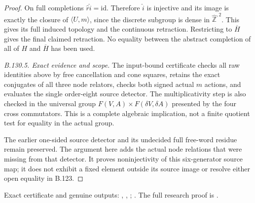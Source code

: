 \begin{proof}
On full completions $\widehat r\widehat i=\mathrm{id}$.
Therefore $\widehat i$ is injective and its image is exactly
the closure of $\langle U,m\rangle$, since the discrete subgroup
is dense in $\widehat{\mathbb Z}^{,2}$. This gives its full
induced topology and the continuous retraction. Restricting to
$\overline H$ gives the final claimed retraction. No equality
between the abstract completion of all of $H$ and
$\overline H$ has been used.

\emph{B.130.5. Exact evidence and scope.}
The input-bound certificate checks all raw identities above by
free cancellation and cone squares, retains the exact conjugates
of all three node relators, checks both signed actual $m$ actions,
and evaluates the single order-eight source detector. The
multiplicativity step is also checked in the universal group
$F(V,A)\times F(\delta V,\delta A)$ presented by the four cross
commutators. This is a complete algebraic implication, not a
finite quotient test for equality in the actual group.

The earlier one-sided source detector and its undecided full
free-word residue remain preserved. The argument here adds the
actual node relations that were missing from that detector.
It proves noninjectivity of this six-generator source map;
it does not exhibit a fixed element outside its source image
or resolve either open equality in B.123.
\end{proof}

\begingroup\raggedright\footnotesize
Exact certificate and genuine outputs:
,
,
;
.
The full research proof is
.
\par\endgroup
